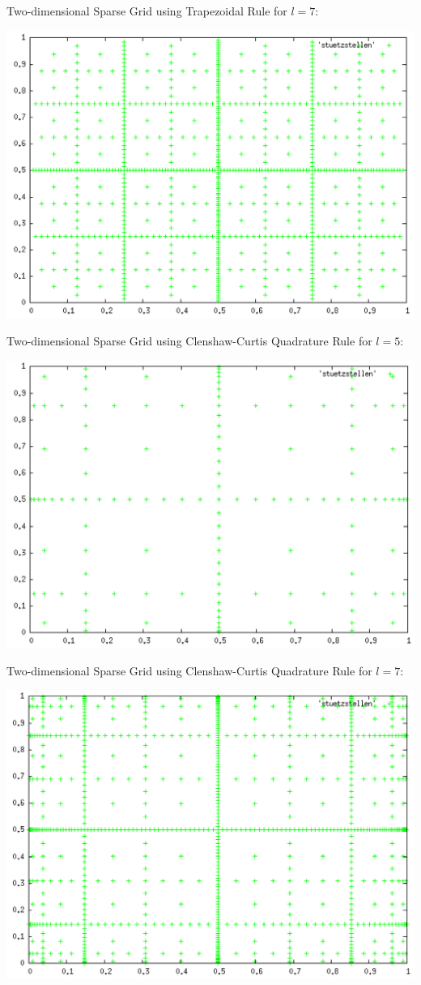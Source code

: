\documentclass[10pt,a4paper]{article}
\begin{document}
Two-dimensional Sparse Grid using Trapezoidal Rule for $l=7$:
\begin{center}
\includegraphics[scale=0.5]{sparse_grid_l7.png}	
\end{center}

Two-dimensional Sparse Grid using Clenshaw-Curtis Quadrature Rule for $l=5$:
\begin{center}
\includegraphics[scale=0.5]{clenshaw_curtis_l5.png}	
\end{center}

Two-dimensional Sparse Grid using Clenshaw-Curtis Quadrature Rule for $l=7$:
\begin{center}
\includegraphics[scale=0.5]{clenshaw_curtis_l7.png}	
\end{center}
\end{document}
